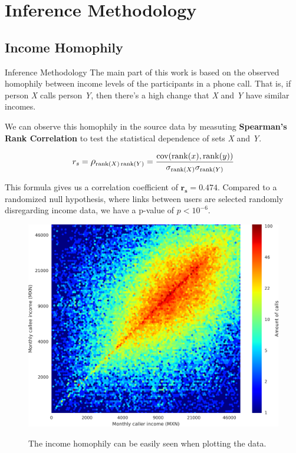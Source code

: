 \documentclass{beamer}
\begin{document}
\section{Inference Methodology}
\subsection{Income Homophily}

\begin{frame}{Inference Methodology}
The main part of this work is based on the observed homophily between income levels of the participants in a phone call. That is, if person \emph{X} calls person \emph{Y}, then there's a high change that \emph{X} and \emph{Y} have similar incomes.
	
We can observe this homophily in the source data by measuting \textbf{Spearman's Rank Correlation} to test the statistical dependence of sets \emph{X} and \emph{Y}.

\[
	r_s = \mathlarger{\rho}_{\operatorname{rank}(X) \operatorname{rank}(Y)} = \frac{\operatorname{cov}(\operatorname{rank}(x), \operatorname{rank}(y))}{\sigma_{\operatorname{rank}(X)} \sigma_{\operatorname{rank}(Y)}}
\]

This formula gives us a correlation coefficient of \( \mathbf{r_s = 0.474} \). Compared to a randomized null hypothesis, where links between users are selected randomly disregarding income data, we have a p-value of \( p < 10^{-6} \).

\end{frame}
\begin{frame}

\begin{figure}[h]
	\begin{center}
		{\includegraphics[height=0.8\textheight]
		{../figures/Homophily_income_origin_target_1/Homophily_income_origin_target_1.png}
		}\label{homophily_heatmap}
	\end{center}
	\caption{The income homophily can be easily seen when plotting the data.}
\end{figure}

\end{frame}
\end{document}
